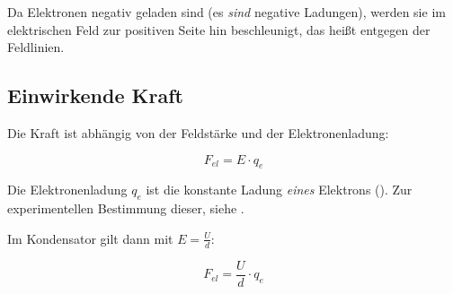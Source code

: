 




%
%	






Da Elektronen negativ geladen sind (es \emph{sind} negative Ladungen), werden sie im elektrischen Feld zur positiven Seite hin beschleunigt, das heißt entgegen der Feldlinien. 

\subsection{Einwirkende Kraft}

Die Kraft ist abhängig von der Feldstärke und der Elektronenladung:

\begin{equation}
	F_{el} = E \cdot q_e
\end{equation}

\noindent Die Elektronenladung $q_e$ ist die konstante Ladung \emph{eines} Elektrons (). Zur experimentellen Bestimmung dieser, siehe .

Im Kondensator gilt dann mit $E=\frac{U}{d}$:

\begin{equation} \label{eq:F_el}
	F_{el} = \frac{U}{d} \cdot q_e
\end{equation}
